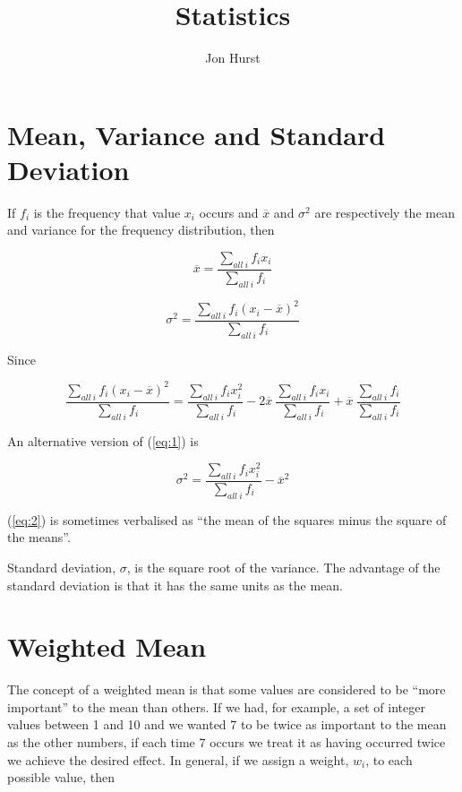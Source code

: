 \documentclass[a5paper]{article}
\title{Statistics}
\author{Jon Hurst}
\begin{document}
\maketitle

\section{Mean, Variance and Standard Deviation}

If $f_i$ is the frequency that value $x_i$ occurs and $\overline{x}$ and
$\sigma^2$ are respectively the mean and variance for the frequency
distribution, then

\begin{equation}
  \overline{x} = \frac{\sum\limits_{all\ i} f_i x_i}{\sum\limits_{all\ i} f_i}
\end{equation}

\begin{equation} \label{eq:1}
  \sigma^2 = \frac{\sum\limits_{all\ i} f_i (x_i - \overline{x})^2}{\sum\limits_{all\ i} f_i}
\end{equation}

Since

\begin{equation}
  \frac{\sum\limits_{all\ i} f_i (x_i - \overline{x})^2}{\sum\limits_{all\ i} f_i} =
  \frac{\sum\limits_{all\ i} f_i x_i^2}{\sum\limits_{all\ i} f_i}
  -2\overline{x}\ \frac{\sum\limits_{all\ i} f_i x_i}{\sum\limits_{all\ i} f_i}
  + \overline{x}\ \frac{\sum\limits_{all\ i} f_i}{\sum\limits_{all\ i} f_i}
\end{equation}

An alternative version of (\ref{eq:1}) is

\begin{equation} \label{eq:2}
  \sigma^2 = \frac{\sum\limits_{all\ i} f_i x_i^2}{\sum\limits_{all\ i} f_i} -
  \overline{x}^2
\end{equation}

(\ref{eq:2}) is sometimes verbalised as ``the mean of the squares minus the square
of the means''.

Standard deviation, $\sigma$, is the square root of the variance. The advantage
of the standard deviation is that it has the same units as the mean.

\section{Weighted Mean}

The concept of a weighted mean is that some values are considered to be ``more
important'' to the mean than others. If we had, for example, a set of integer
values between 1 and 10 and we wanted 7 to be twice as important to the mean as
the other numbers, if each time 7 occurs we treat it as having occurred twice we
achieve the desired effect. In general, if we assign a weight, $w_i$, to each
possible value, then
\end{document}
